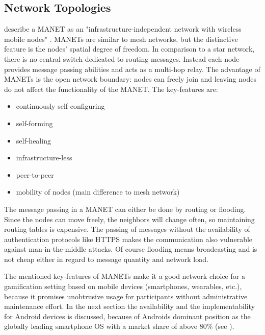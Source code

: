 	\subsection{Network Topologies}
	\label{Network Topologies}
	
	\textcite{Dorri2015} describe a \gls{MANET} as an "infrastructure-independent network with wireless mobile nodes" \autocite[p. 15]{Dorri2015}. \glspl{MANET} are similar to mesh networks, but the distinctive feature is the nodes' spatial degree of freedom. In comparison to a star network, there is no central switch dedicated to routing messages. Instead each node provides message passing abilities and acts as a multi-hop relay.
	The advantage of \glspl{MANET} is the open network boundary: nodes can freely join and leaving nodes do not affect the functionality of the \gls{MANET}. The key-features are:
	
	\begin{itemize}  
		\item continuously self-configuring
		\item self-forming
		\item self-healing
		\item infrastructure-less
		\item peer-to-peer
		\item  mobility of nodes (main difference to mesh network)
	\end{itemize}
			
	The message passing in a \gls{MANET} can either be done by routing or flooding. Since the nodes can move freely, the neighbors will change often, so maintaining routing tables is expensive. The passing of messages without the availability of authentication protocols like \gls{HTTPS} makes the communication also vulnerable against man-in-the-middle attacks. Of course flooding means broadcasting and is not cheap either in regard to message quantity and network load.
	
	The mentioned key-features of \glspl{MANET} make it a good network choice for a gamification setting based on mobile devices (smartphones, wearables, etc.), because it promises unobtrusive usage for participants without administrative maintenance effort. In the next section the availability and the implementability for Android devices is discussed, because of Androids dominant position as the globally leading smartphone \gls{OS} with a market share of above 80\% (see \textcite{Online:Gartner2016}). 
	
